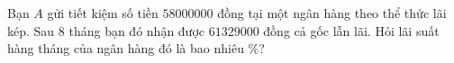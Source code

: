 \begin{ex}%
	Bạn $A$ gửi tiết kiệm số tiền $58000000$ đồng tại một ngân hàng theo thể thức lãi kép. Sau $8$ tháng bạn đó nhận được $61329000$ đồng cả gốc lẫn lãi. Hỏi lãi suất hàng tháng của ngân hàng đó là bao nhiêu $\%$?\par
\end{ex}

